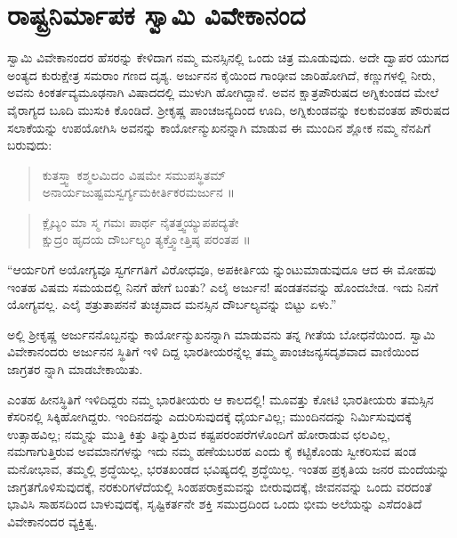 
\chapter*{ರಾಷ್ಟ್ರನಿರ್ಮಾಪಕ ಸ್ವಾಮಿ ವಿವೇಕಾನಂದ}

ಸ್ವಾಮಿ ವಿವೇಕಾನಂದರ ಹೆಸರನ್ನು ಕೇಳಿದಾಗ ನಮ್ಮ ಮನಸ್ಸಿನಲ್ಲಿ ಒಂದು ಚಿತ್ರ ಮೂಡುವುದು. ಅದೇ ದ್ವಾಪರ ಯುಗದ ಅಂತ್ಯದ ಕುರುಕ್ಷೇತ್ರ ಸಮರಾಂ ಗಣದ ದೃಶ್ಯ. ಅರ್ಜುನನ ಕೈಯಿಂದ ಗಾಂಢೀವ ಜಾರಿಹೋಗಿದೆ, ಕಣ್ಣುಗಳಲ್ಲಿ ನೀರು, ಅವನು ಕಿಂಕರ್ತವ್ಯಮೂಢನಾಗಿ ವಿಷಾದದಲ್ಲಿ ಮುಳುಗಿ ಹೋಗಿದ್ದಾನೆ. ಅವನ ಕ್ಷಾತ್ರಪೌರುಷದ ಅಗ್ನಿಕುಂಡದ ಮೇಲೆ ವೈರಾಗ್ಯದ ಬೂದಿ ಮುಸುಕಿ ಕೊಂಡಿದೆ. ಶ್ರೀಕೃಷ್ಣ ಪಾಂಚಜನ್ಯದಿಂದ ಊದಿ, ಅಗ್ನಿಕುಂಡವನ್ನು ಕಲಕುವಂತಹ ಪೌರುಷದ ಸಲಾಕೆಯನ್ನು ಉಪಯೋಗಿಸಿ ಅವನನ್ನು ಕಾರ್ಯೋನ್ಮುಖನನ್ನಾಗಿ ಮಾಡುವ ಈ ಮುಂದಿನ ಶ್ಲೋಕ ನಮ್ಮ ನೆನಪಿಗೆ ಬರುವುದು:

\begin{verse}
ಕುತಸ್ತ್ವಾ ಕಶ್ಮಲಮಿದಂ ವಿಷಮೇ ಸಮುಪಸ್ಥಿತಮ್​\\ಅನಾರ್ಯಜುಷ್ಟಮಸ್ವರ್ಗ್ಯಮಕೀರ್ತಿಕರಮರ್ಜುನ ॥
\end{verse}

\begin{verse}
ಕ್ಲೈಬ್ಯಂ ಮಾ ಸ್ಮ ಗಮಃ ಪಾರ್ಥ ನೈತತ್ತ್ವಯ್ಯುಪಪದ್ಯತೇ \\ಕ್ಷುದ್ರಂ ಹೃದಯ ದೌರ್ಬಲ್ಯಂ ತ್ಯಕ್ತ್ವೋತ್ತಿಷ್ಠ ಪರಂತಪ ॥
\end{verse}

“ಆರ್ಯರಿಗೆ ಅಯೋಗ್ಯವೂ ಸ್ವರ್ಗಗತಿಗೆ ವಿರೋಧವೂ, ಅಪಕೀರ್ತಿಯ ನ್ನುಂಟುಮಾಡುವುದೂ ಆದ ಈ ಮೋಹವು ಇಂತಹ ವಿಷಮ ಸಮಯದಲ್ಲಿ ನಿನಗೆ ಹೇಗೆ ಬಂತು? ಎಲೈ ಅರ್ಜುನ! ಷಂಡತನವನ್ನು ಹೊಂದಬೇಡ. ಇದು ನಿನಗೆ ಯೋಗ್ಯವಲ್ಲ. ಎಲೈ ಶತ್ರುತಾಪನನೆ ತುಚ್ಛವಾದ ಮನಸ್ಸಿನ ದೌರ್ಬಲ್ಯವನ್ನು ಬಿಟ್ಟು ಏಳು.”

ಅಲ್ಲಿ ಶ್ರೀಕೃಷ್ಣ ಅರ್ಜುನನೊಬ್ಬನನ್ನು ಕಾರ್ಯೋನ್ಮುಖನನ್ನಾಗಿ ಮಾಡುವನು ತನ್ನ ಗೀತೆಯ ಬೋಧನೆಯಿಂದ. ಸ್ವಾಮಿ ವಿವೇಕಾನಂದರು ಅರ್ಜುನನ ಸ್ಥಿತಿಗೆ ಇಳಿ ದಿದ್ದ ಭಾರತೀಯರನ್ನೆಲ್ಲ ತಮ್ಮ ಪಾಂಚಜನ್ಯಸದೃಶವಾದ ವಾಣಿಯಿಂದ ಜಾಗ್ರತರ ನ್ನಾಗಿ ಮಾಡಬೇಕಾಯಿತು.

ಎಂತಹ ಹೀನಸ್ಥಿತಿಗೆ ಇಳಿದಿದ್ದರು ನಮ್ಮ ಭಾರತೀಯರು ಆ ಕಾಲದಲ್ಲಿ! ಮೂವತ್ತು ಕೋಟಿ ಭಾರತೀಯರು ತಮಸ್ಸಿನ ಕೆಸರಿನಲ್ಲಿ ಸಿಕ್ಕಿಹೋಗಿದ್ದರು. ಇಂದಿನದನ್ನು ಎದುರಿಸುವುದಕ್ಕೆ ಧೈರ್ಯವಿಲ್ಲ; ಮುಂದಿನದನ್ನು ನಿರ್ಮಿಸುವುದಕ್ಕೆ ಉತ್ಸಾಹವಿಲ್ಲ; ನಮ್ಮನ್ನು ಮುತ್ತಿ ಕಿತ್ತು ತಿನ್ನುತ್ತಿರುವ ಕಷ್ಟಪರಂಪರೆಗಳೊಂದಿಗೆ ಹೋರಾಡುವ ಛಲವಿಲ್ಲ, ನಮಗಾಗುತ್ತಿರುವ ಅವಮಾನಗಳನ್ನು ಇದು ನಮ್ಮ ಹಣೆಯಬರಹ ಎಂದು ಕೈ ಕಟ್ಟಿಕೊಂಡು ಸ್ವೀಕರಿಸುವ ಷಂಡ ಮನೋಭಾವ, ತಮ್ಮಲ್ಲಿ ಶ್ರದ್ಧೆಯಿಲ್ಲ, ಭರತಖಂಡದ ಭವಿಷ್ಯದಲ್ಲಿ ಶ್ರದ್ಧೆಯಿಲ್ಲ. ಇಂತಹ ಪ್ರಕೃತಿಯ ಜನರ ಮಂದೆಯನ್ನು ಜಾಗ್ರತಗೊಳಿಸುವುದಕ್ಕೆ, ನರಕುರಿಗಳೆದೆಯಲ್ಲಿ ಸಿಂಹಪರಾಕ್ರಮವನ್ನು ಬೀರುವುದಕ್ಕೆ, ಜೀವನವನ್ನು ಒಂದು ವರದಂತೆ ಭಾವಿಸಿ ಸಾಹಸದಿಂದ ಬಾಳುವುದಕ್ಕೆ, ಸೃಷ್ಟಿಕರ್ತನೇ ಶಕ್ತಿ ಸಮುದ್ರದಿಂದ ಒಂದು ಭೀಮ ಅಲೆಯನ್ನು ಎಸೆದಂತಿದೆ ವಿವೇಕಾನಂದರ ವ್ಯಕ್ತಿತ್ವ.

